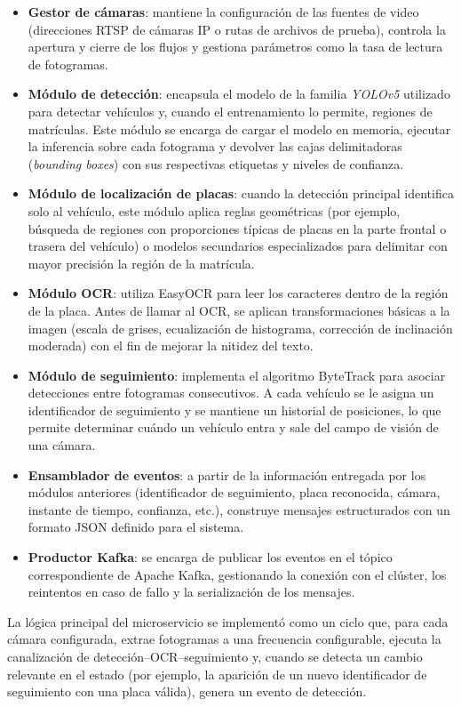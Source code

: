 \begin{itemize}
    \item \textbf{Gestor de cámaras}: mantiene la configuración de las fuentes de video (direcciones RTSP de cámaras IP o rutas de archivos de prueba), controla la apertura y cierre de los flujos y gestiona parámetros como la tasa de lectura de fotogramas.
    \item \textbf{Módulo de detección}: encapsula el modelo de la familia \textit{YOLOv5} utilizado para detectar vehículos y, cuando el entrenamiento lo permite, regiones de matrículas. Este módulo se encarga de cargar el modelo en memoria, ejecutar la inferencia sobre cada fotograma y devolver las cajas delimitadoras (\textit{bounding boxes}) con sus respectivas etiquetas y niveles de confianza.
    \item \textbf{Módulo de localización de placas}: cuando la detección principal identifica solo al vehículo, este módulo aplica reglas geométricas (por ejemplo, búsqueda de regiones con proporciones típicas de placas en la parte frontal o trasera del vehículo) o modelos secundarios especializados para delimitar con mayor precisión la región de la matrícula.
    \item \textbf{Módulo OCR}: utiliza EasyOCR para leer los caracteres dentro de la región de la placa. Antes de llamar al OCR, se aplican transformaciones básicas a la imagen (escala de grises, ecualización de histograma, corrección de inclinación moderada) con el fin de mejorar la nitidez del texto.
    \item \textbf{Módulo de seguimiento}: implementa el algoritmo ByteTrack para asociar detecciones entre fotogramas consecutivos. A cada vehículo se le asigna un identificador de seguimiento y se mantiene un historial de posiciones, lo que permite determinar cuándo un vehículo entra y sale del campo de visión de una cámara.
    \item \textbf{Ensamblador de eventos}: a partir de la información entregada por los módulos anteriores (identificador de seguimiento, placa reconocida, cámara, instante de tiempo, confianza, etc.), construye mensajes estructurados con un formato JSON definido para el sistema.
    \item \textbf{Productor Kafka}: se encarga de publicar los eventos en el tópico correspondiente de Apache Kafka, gestionando la conexión con el clúster, los reintentos en caso de fallo y la serialización de los mensajes.
\end{itemize}

La lógica principal del microservicio se implementó como un ciclo que, para cada cámara configurada, extrae fotogramas a una frecuencia configurable, ejecuta la canalización de detección–OCR–seguimiento y, cuando se detecta un cambio relevante en el estado (por ejemplo, la aparición de un nuevo identificador de seguimiento con una placa válida), genera un evento de detección.

